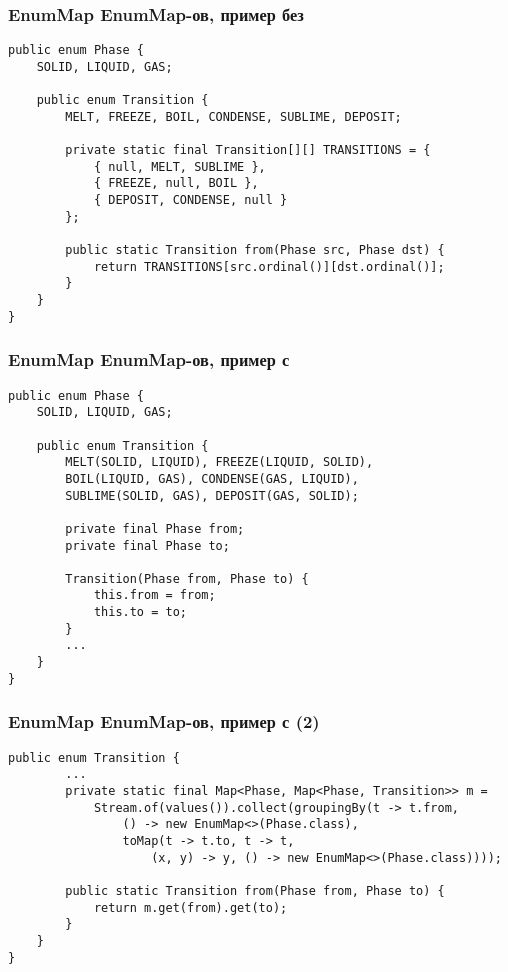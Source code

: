 \documentclass[xetex,mathserif,serif]{beamer}
\begin{document}
	\begin{frame}[fragile]
		\frametitle{EnumMap EnumMap-ов, пример без}
		\begin{small}
			\begin{verbatim}
public enum Phase {
    SOLID, LIQUID, GAS;
    
    public enum Transition {
        MELT, FREEZE, BOIL, CONDENSE, SUBLIME, DEPOSIT;
        
        private static final Transition[][] TRANSITIONS = {
            { null, MELT, SUBLIME },
            { FREEZE, null, BOIL },
            { DEPOSIT, CONDENSE, null }
        };

        public static Transition from(Phase src, Phase dst) { 
            return TRANSITIONS[src.ordinal()][dst.ordinal()]; 
        }
    }
}
			\end{verbatim}
		\end{small}
	\end{frame}

	\begin{frame}[fragile]
		\frametitle{EnumMap EnumMap-ов, пример с}
		\begin{small}
			\begin{verbatim}
public enum Phase {
    SOLID, LIQUID, GAS;
    
    public enum Transition {
        MELT(SOLID, LIQUID), FREEZE(LIQUID, SOLID),
        BOIL(LIQUID, GAS), CONDENSE(GAS, LIQUID),
        SUBLIME(SOLID, GAS), DEPOSIT(GAS, SOLID);

        private final Phase from;
        private final Phase to;
        
        Transition(Phase from, Phase to) {
            this.from = from;
            this.to = to;
        }
        ...
    }
}
			\end{verbatim}
		\end{small}
	\end{frame}

	\begin{frame}[fragile]
		\frametitle{EnumMap EnumMap-ов, пример с (2)}
		\begin{footnotesize}
			\begin{verbatim}
public enum Transition {
        ...
        private static final Map<Phase, Map<Phase, Transition>> m =
            Stream.of(values()).collect(groupingBy(t -> t.from,
                () -> new EnumMap<>(Phase.class),
                toMap(t -> t.to, t -> t,
                    (x, y) -> y, () -> new EnumMap<>(Phase.class))));
        
        public static Transition from(Phase from, Phase to) { 
            return m.get(from).get(to); 
        }
    }
}
			\end{verbatim}
		\end{footnotesize}
	\end{frame}
\end{document}
